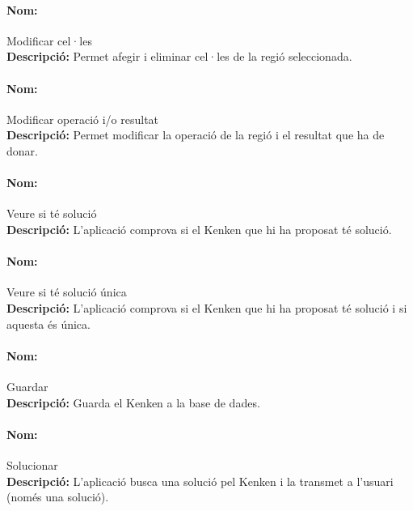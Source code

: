 \documentclass[a4paper,12pt]{article}
\begin{document}
\paragraph{Nom:} Modificar cel·les\\
\textbf{Descripció:}
Permet afegir i eliminar cel·les de la regió seleccionada.

\paragraph{Nom:} Modificar operació i/o resultat\\
\textbf{Descripció:}
Permet modificar la operació de la regió i el resultat que ha de donar.

\paragraph{Nom:} Veure si té solució\\
\textbf{Descripció:} 
L'aplicació comprova si el Kenken que hi ha proposat té solució.

\paragraph{Nom:} Veure si té solució única\\
\textbf{Descripció:} 
L'aplicació comprova si el Kenken que hi ha proposat té solució i si 
aquesta és única.

\paragraph{Nom:} Guardar\\
\textbf{Descripció:} 
Guarda el Kenken a la base de dades.

\paragraph{Nom:} Solucionar\\
\textbf{Descripció:} 
L'aplicació busca una solució pel Kenken i la transmet a l'usuari (només una solució).



\newpage
\end{document}
